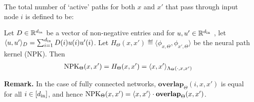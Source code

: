 \begin{definition}\label{def:overlap} 
The total number of `active' paths for both $x$ and $x'$ that pass through input node $i$ is defined to be:\\
{}
\end{definition}
%
\begin{lemma}\label{lm:npk}
Let $D\in\mathbb{R}^{d_{\text{in}}}$ be a vector of non-negative entries  and for $u,u'\in\mathbb{R}^{d_{\text{in}}}$ , let $\langle u,u'\rangle_{D}=\sum_{i=1}^{d_{\text{in}}}D(i)u(i)u'(i)$. Let $H_{\Theta}(x,x')\eqdef\langle\phi_{x,\Theta},\phi_{x',\Theta} \rangle$ be the neural path kernel (NPK). Then  
\begin{align*} 
\text{NPK}_{\Theta}(x,x')= H_{\Theta}(x,x')=\langle x,x'\rangle_{\Lambda_{\Theta}(\cdot,x,x')} 
\end{align*}
\end{lemma}
\textbf{Remark.} In the case of fully connected networks, $\textbf{overlap}_{\Theta}(i,x,x')$ is equal for all $i\in[d_{\text{in}}]$, and hence $\text{NPK}_{\Theta}(x,x')=\langle x,x'\rangle\cdot\textbf{overlap}_{\Theta}(x,x')$.

